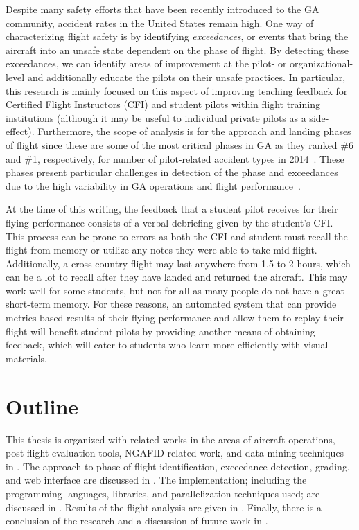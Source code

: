 	Despite many safety efforts that have been recently introduced to the GA community, accident rates in the United States remain high.  One way of characterizing flight safety is by identifying \textit{exceedances}, or events that bring the aircraft into an unsafe state dependent on the phase of flight.  By detecting these exceedances, we can identify areas of improvement at the pilot- or organizational-level and additionally educate the pilots on their unsafe practices.  In particular, this research is mainly focused on this aspect of improving teaching feedback for Certified Flight Instructors (CFI) and student pilots within flight training institutions (although it may be useful to individual private pilots as a side-effect).  Furthermore, the scope of analysis is for the approach and landing phases of flight since these are some of the most critical phases in GA as they ranked \#6 and \#1, respectively, for number of pilot-related accident types in 2014~\cite{kenny201726th}.  These phases present particular challenges in detection of the phase and exceedances due to the high variability in GA operations and flight performance~\cite{goblet2015identifying,goblet2016phase,fala2016detecting}.
    
    At the time of this writing, the feedback that a student pilot receives for their flying performance consists of a verbal debriefing given by the student's CFI.  This process can be prone to errors as both the CFI and student must recall the flight from memory or utilize any notes they were able to take mid-flight.  Additionally, a cross-country flight may last anywhere from 1.5 to 2 hours, which can be a lot to recall after they have landed and returned the aircraft.  This may work well for some students, but not for all as many people do not have a great short-term memory.  For these reasons, an automated system that can provide metrics-based results of their flying performance and allow them to replay their flight will benefit student pilots by providing another means of obtaining feedback, which will cater to students who learn more efficiently with visual materials.


\section{Outline} \label{sec:outline}

	This thesis is organized with related works in the areas of aircraft operations, post-flight evaluation tools, NGAFID related work, and data mining techniques in .  The approach to phase of flight identification, exceedance detection, grading, and web interface are discussed in .  The implementation; including the programming languages, libraries, and parallelization techniques used; are discussed in .  Results of the flight analysis are given in .  Finally, there is a conclusion of the research and a discussion of future work in .
    
    
    
